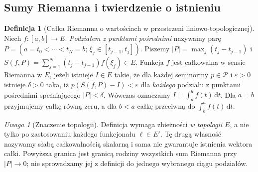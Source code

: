 \documentclass[11pt,a4paper]{article}
\numberwithin{equation}{section}
\theoremstyle{plain}
\theoremstyle{definition}
\newtheorem{definicja}[twierdzenie]{Definicja}
\theoremstyle{remark}
\newtheorem{uwaga}[twierdzenie]{Uwaga}
\begin{document}
\subsection{Sumy Riemanna i twierdzenie o istnieniu}

\begin{definicja}[Całka Riemanna o wartościach w przestrzeni liniowo-topologicznej]
\label{def:riemann-lcs15a}
Niech $f:[a,b]\to E$. \emph{Podziałem z punktami pośrednimi} nazywamy
parę $P=(a=t_0<\cdots<t_N=b;\,\xi_j\in[t_{j-1},t_j])$.
Piszemy $|P|=\max_j(t_j-t_{j-1})$ i
$S(f,P)=\sum_{j=1}^N(t_j-t_{j-1})f(\xi_j)\in E$.
Funkcja $f$ jest całkowalna w sensie Riemanna w $E$, jeżeli istnieje $I\in E$
takie, że dla każdej seminormy $p\in\mathcal P$ i $\varepsilon>0$ istnieje
$\delta>0$ taka, iż $p(S(f,P)-I)<\varepsilon$ dla \emph{każdego} podziału
z punktami pośrednimi spełniającego $|P|<\delta$.
Wówczas oznaczamy $I=\int_a^b f(t)\,\mathrm dt$.
Dla $a=b$ przyjmujemy całkę równą zeru, a dla $b<a$ całkę
przeciwną do $\int_b^a f(t)\,\mathrm dt$.
\end{definicja}

\begin{uwaga}[Znaczenie topologii]
Definicja wymaga zbieżności \emph{w topologii $E$}, a nie tylko po
zastosowaniu każdego funkcjonału $\ell\in E'$. Tę drugą własność nazywamy
słabą całkowalnością skalarną i sama nie gwarantuje istnienia wektora całki.
Powyższa granica jest granicą rodziny wszystkich sum Riemanna przy
$|P|\to0$; nie sprowadzamy jej z definicji do jednego wybranego ciągu podziałów.
\end{uwaga}
\end{document}
